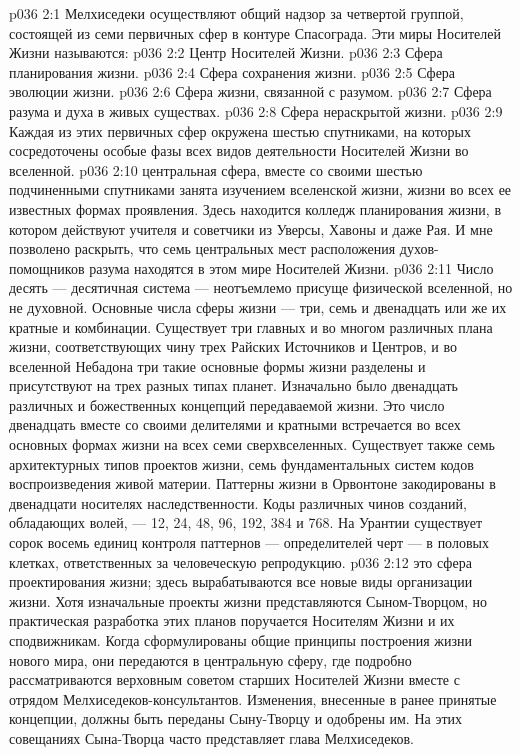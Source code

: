 \vs p036 2:1 Мелхиседеки осуществляют общий надзор за четвертой группой, состоящей из семи первичных сфер в контуре Спасограда. Эти миры Носителей Жизни называются:
\vs p036 2:2 \bibnobreakspace Центр Носителей Жизни.
\vs p036 2:3 \bibnobreakspace Сфера планирования жизни.
\vs p036 2:4 \bibnobreakspace Сфера сохранения жизни.
\vs p036 2:5 \bibnobreakspace Сфера эволюции жизни.
\vs p036 2:6 \bibnobreakspace Сфера жизни, связанной с разумом.
\vs p036 2:7 \bibnobreakspace Сфера разума и духа в живых существах.
\vs p036 2:8 \bibnobreakspace Сфера нераскрытой жизни.
\vs p036 2:9 \pc Каждая из этих первичных сфер окружена шестью спутниками, на которых сосредоточены особые фазы всех видов деятельности Носителей Жизни во вселенной.
\vs p036 2:10 \pc {} центральная сфера, вместе со своими шестью подчиненными спутниками занята изучением вселенской жизни, жизни во всех ее известных формах проявления. Здесь находится колледж планирования жизни, в котором действуют учителя и советчики из Уверсы, Хавоны и даже Рая. И мне позволено раскрыть, что семь центральных мест расположения духов\hyp{}помощников разума находятся в этом мире Носителей Жизни.
\vs p036 2:11 Число десять --- десятичная система --- неотъемлемо присуще физической вселенной, но не духовной. Основные числа сферы жизни --- три, семь и двенадцать или же их кратные и комбинации. Существует три главных и во многом различных плана жизни, соответствующих чину трех Райских Источников и Центров, и во вселенной Небадона три такие основные формы жизни разделены и присутствуют на трех разных типах планет. Изначально было двенадцать различных и божественных концепций передаваемой жизни. Это число двенадцать вместе со своими делителями и кратными встречается во всех основных формах жизни на всех семи сверхвселенных. Существует также семь архитектурных типов проектов жизни, семь фундаментальных систем кодов воспроизведения живой материи. Паттерны жизни в Орвонтоне закодированы в двенадцати носителях наследственности. Коды различных чинов созданий, обладающих волей, --- 12, 24, 48, 96, 192, 384 и 768. На Урантии существует сорок восемь единиц контроля паттернов --- определителей черт --- в половых клетках, ответственных за человеческую репродукцию.
\vs p036 2:12 \pc {} это сфера проектирования жизни; здесь вырабатываются все новые виды организации жизни. Хотя изначальные проекты жизни представляются Сыном\hyp{}Творцом, но практическая разработка этих планов поручается Носителям Жизни и их сподвижникам. Когда сформулированы общие принципы построения жизни нового мира, они передаются в центральную сферу, где подробно рассматриваются верховным советом старших Носителей Жизни вместе с отрядом Мелхиседеков\hyp{}консультантов. Изменения, внесенные в ранее принятые концепции, должны быть переданы Сыну\hyp{}Творцу и одобрены им. На этих совещаниях Сына\hyp{}Творца часто представляет глава Мелхиседеков.
